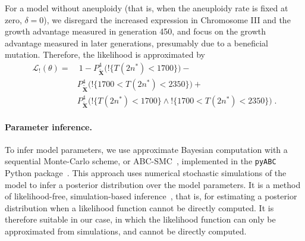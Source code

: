 \documentclass[12pt]{article}
\let\vec\mathbf
\newcommand{\likelihood}{\mathcal{L}}
\begin{document}
For a model without aneuploidy (that is, when the aneuploidy rate is fixed at zero, $\delta=0$), we disregard the increased expression in Chromosome III and the growth advantage measured in generation 450, and focus on the growth advantage measured in later generations, presumably due to a beneficial mutation. 
Therefore, the likelihood is approximated by
\begin{equation}\begin{aligned}
\label{eq:heatstress-noaneuploidy-likelihood}
\likelihood_{!}(\theta) = &\ 
	1 - 
	P_{\tilde{\vec X}}^4\big(!\{T(2n^*)<1700\}\big) - \\
&	P_{\tilde{\vec X}}^4\big(!\{1700 < T(2n^*) < 2350\}\big) + \\
&	P_{\tilde{\vec X}}^4\big(!\{T(2n^*)<1700\} \land !\{1700 < T(2n^*) < 2350\}\big)
\;.
\end{aligned}\end{equation}

\paragraph{Parameter inference.} To infer model parameters, we use approximate Bayesian computation with a sequential Monte-Carlo scheme, or ABC-SMC~\citep{Sisson2009}, implemented in the \texttt{pyABC} Python package~\citep[\href{https://pyabc.readthedocs.io}{pyabc.readthedocs.io}]{Klinger2018}.
This approach uses numerical stochastic simulations of the model to infer a posterior distribution over the model parameters. It is a method of likelihood-free, simulation-based inference~\citep{Cranmer2020}, that is, for estimating a posterior distribution when a likelihood function cannot be directly computed. It is therefore suitable in our case, in which the likelihood function can only be approximated from simulations, and cannot be directly computed. 
\end{document}
